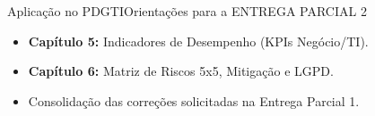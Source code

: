 \begin{senaiframe}{Aplicação no PDGTI}{Orientações para a ENTREGA PARCIAL 2}
  \vspace{0.2cm}
  \begin{tcolorbox}[senaigreencard, title={Entrega Parcial 2 (Capítulos 5 e 6) – Data: 09/Out}]
    \begin{itemize}
      \item \textbf{Capítulo 5:} Indicadores de Desempenho (KPIs Negócio/TI).
      \item \textbf{Capítulo 6:} Matriz de Riscos 5x5, Mitigação e LGPD.
      \item Consolidação das correções solicitadas na Entrega Parcial 1.
    \end{itemize}
  \end{tcolorbox}
\end{senaiframe}
